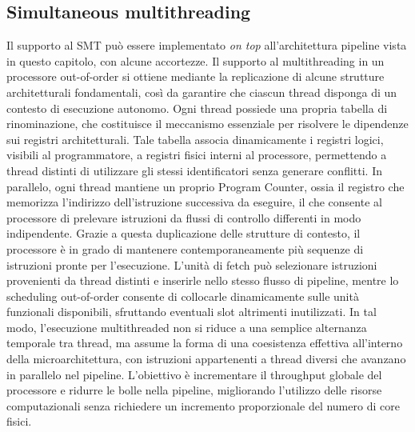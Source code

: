 \subsection{Simultaneous multithreading}
Il supporto al SMT può essere implementato \textit{on top} all'architettura pipeline vista in questo capitolo, con alcune accortezze. 
Il supporto al multithreading in un processore out-of-order si ottiene mediante la replicazione di alcune strutture architetturali fondamentali, così da garantire che ciascun thread disponga di un contesto di esecuzione autonomo. Ogni thread possiede una propria tabella di rinominazione, che costituisce il meccanismo essenziale per risolvere le dipendenze sui registri architetturali. Tale tabella associa dinamicamente i registri logici, visibili al programmatore, a registri fisici interni al processore, permettendo a thread distinti di utilizzare gli stessi identificatori senza generare conflitti. In parallelo, ogni thread mantiene un proprio Program Counter, ossia il registro che memorizza l'indirizzo dell'istruzione successiva da eseguire, il che consente al processore di prelevare istruzioni da flussi di controllo differenti in modo indipendente.
Grazie a questa duplicazione delle strutture di contesto, il processore è in grado di mantenere contemporaneamente più sequenze di istruzioni pronte per l'esecuzione. L'unità di fetch può selezionare istruzioni provenienti da thread distinti e inserirle nello stesso flusso di pipeline, mentre lo scheduling out-of-order consente di collocarle dinamicamente sulle unità funzionali disponibili, sfruttando eventuali slot altrimenti inutilizzati. In tal modo, l'esecuzione multithreaded non si riduce a una semplice alternanza temporale tra thread, ma assume la forma di una coesistenza effettiva all'interno della microarchitettura, con istruzioni appartenenti a thread diversi che avanzano in parallelo nel pipeline. L'obiettivo è incrementare il throughput globale del processore e ridurre le bolle nella pipeline, migliorando l'utilizzo delle risorse computazionali senza richiedere un incremento proporzionale del numero di core fisici.

\begin{figure}[ht]
    \centering
    \setlength{\fboxrule}{0.5pt} %
    \setlength{\fboxsep}{0pt}    %
\end{figure}

